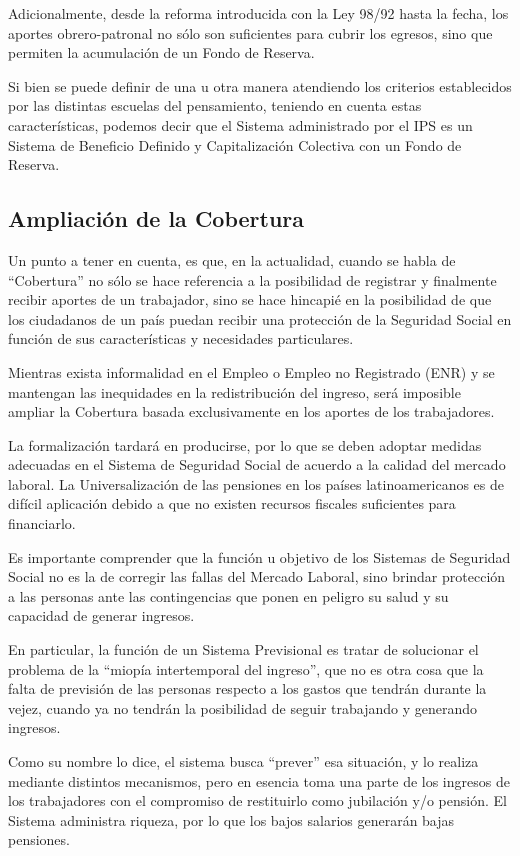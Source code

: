 \documentclass[a4paper,11pt]{article}
\begin{document}
Adicionalmente, desde la reforma introducida con la Ley 98/92 hasta la fecha, los aportes obrero-patronal no sólo son suficientes para cubrir los egresos, sino que permiten la acumulación de un Fondo de Reserva.  

Si bien se puede definir de una u otra manera atendiendo los criterios establecidos por las distintas escuelas del pensamiento, teniendo en cuenta estas características, podemos decir que el Sistema administrado por el IPS es un Sistema de Beneficio Definido y Capitalización Colectiva con un Fondo de Reserva.

\subsection{Ampliación de la Cobertura}

Un punto a tener en cuenta, es que, en la actualidad, cuando se habla de “Cobertura” no sólo se hace referencia a la posibilidad de registrar y finalmente recibir aportes de un trabajador, sino se hace hincapié en la posibilidad de que los ciudadanos de un país puedan recibir una protección de la Seguridad Social en función de sus características y necesidades particulares.

Mientras exista informalidad en el Empleo o Empleo no Registrado (ENR) y se mantengan las inequidades en la redistribución del ingreso, será imposible ampliar la Cobertura basada exclusivamente en los aportes de los trabajadores.

La formalización tardará en producirse, por lo que se deben adoptar medidas adecuadas en el Sistema de Seguridad Social de acuerdo a la calidad del mercado laboral.  La Universalización de las pensiones en los países latinoamericanos es de difícil aplicación debido a que no existen recursos fiscales suficientes para financiarlo.

Es importante comprender que la función u objetivo de los Sistemas de Seguridad Social no es la de corregir las fallas del Mercado Laboral, sino brindar protección a las personas ante las contingencias que ponen en peligro su salud y su capacidad de generar ingresos.

En particular, la función de un Sistema Previsional es tratar de solucionar el problema de la “miopía intertemporal del ingreso”, que no es otra cosa que la falta de previsión de las personas respecto a los gastos que tendrán durante la vejez, cuando ya no tendrán la posibilidad de seguir trabajando y generando ingresos.

Como su nombre lo dice, el sistema busca “prever” esa situación, y lo realiza mediante distintos mecanismos, pero en esencia toma una parte de los ingresos de los trabajadores con el compromiso de restituirlo como jubilación y/o pensión. El Sistema administra riqueza, por lo que los bajos salarios generarán bajas pensiones.
\end{document}
